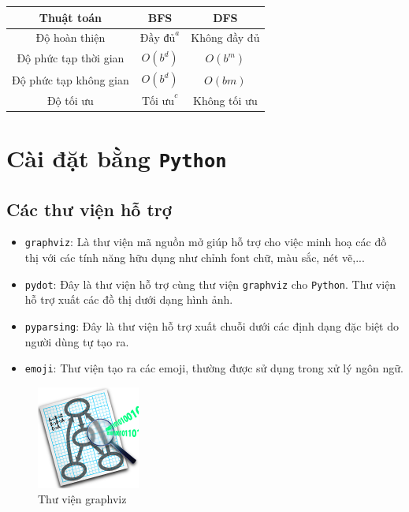 \documentclass[a4paper, 11pt]{article}
\begin{document}
\begin{center}
    \begin{tabular}{ |c|c|c| }
        \hline
        Thuật toán & BFS & DFS \\
        \hline
        Độ hoàn thiện & $\text{Đầy đủ}^{a}$ & Không đầy đủ \\
        \hline
        Độ phức tạp thời gian & $O(b^d)$ & $O(b^m)$ \\
        \hline
        Độ phức tạp không gian & $O(b^d)$ & $O(bm)$ \\
        \hline
        Độ tối ưu  & ${\text{Tối ưu}}^{c}$ & Không tối ưu \\
        \hline
    \end{tabular}
\end{center}

\section{Cài đặt bằng \lstinline|Python|}
\subsection{Các thư viện hỗ trợ}
\begin{itemize}
    \item\lstinline|graphviz|: Là thư viện mã nguồn mở giúp hỗ trợ cho việc minh hoạ các đồ thị với các tính năng hữu dụng như chỉnh font chữ, màu sắc, nét vẽ,...
    \item\lstinline|pydot|: Đây là thư viện hỗ trợ cùng thư viện \lstinline|graphviz| cho \lstinline|Python|. Thư viện hỗ trợ xuất các đồ thị dưới dạng hình ảnh.
    \item\lstinline|pyparsing|: Đây là thư viện hỗ trợ xuất chuỗi dưới các định dạng đặc biệt do người dùng tự tạo ra.
    \item\lstinline|emoji|: Thư viện tạo ra các emoji, thường được sử dụng trong xử lý ngôn ngữ.
\end{itemize}

\begin{figure}[h]
    \centering
    \includegraphics[]{graphviz.png}
    \caption{Thư viện graphviz}
\end{figure}
\end{document}
